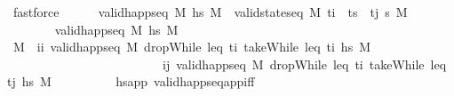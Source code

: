 \begin{isabellebody}
\ fastforce\isanewline
\isanewline
\ \ \ \ \isamarkupfalse%
\ {\isachardoublequoteopen}valid{\isacharunderscore}{\kern0pt}happ{\isacharunderscore}{\kern0pt}seq\ M\ {\isacharquery}{\kern0pt}hs{\isacharprime}{\kern0pt}\ M{\isacharprime}{\kern0pt}\ {\isasymlongleftrightarrow}\ valid{\isacharunderscore}{\kern0pt}state{\isacharunderscore}{\kern0pt}seq\ M\ {\isacharparenleft}{\kern0pt}{\isacharparenleft}{\kern0pt}t\isactrlsub i{\isacharprime}{\kern0pt}\ {\isacharhash}{\kern0pt}\ ts\ {\isacharat}{\kern0pt}\ {\isacharbrackleft}{\kern0pt}t\isactrlsub j{\isacharbrackright}{\kern0pt}{\isacharparenright}{\kern0pt}\ {\isasympi}s\ M{\isacharprime}{\kern0pt}{\isachardoublequoteclose}\isanewline
\ \ \ \ \isamarkupfalse%
\isanewline
\ \ \ \ \ \ \isamarkupfalse%
\ {\isachardoublequoteopen}valid{\isacharunderscore}{\kern0pt}happ{\isacharunderscore}{\kern0pt}seq\ M\ {\isacharquery}{\kern0pt}hs{\isacharprime}{\kern0pt}\ M{\isacharprime}{\kern0pt}{\isachardoublequoteclose}\isanewline
\ \ \ \ \ \ \isamarkupfalse%
\ \isamarkupfalse%
\ M{\isacharprime}{\kern0pt}{\isacharprime}{\kern0pt}\ \ ii{\isacharprime}{\kern0pt}{\isacharcolon}{\kern0pt}\ {\isachardoublequoteopen}valid{\isacharunderscore}{\kern0pt}happ{\isacharunderscore}{\kern0pt}seq\ M\ {\isacharparenleft}{\kern0pt}dropWhile\ {\isacharparenleft}{\kern0pt}leq\ t\isactrlsub i{\isacharparenright}{\kern0pt}\ {\isacharparenleft}{\kern0pt}takeWhile\ {\isacharparenleft}{\kern0pt}leq\ t\isactrlsub i{\isacharprime}{\kern0pt}{\isacharparenright}{\kern0pt}\ hs{\isacharparenright}{\kern0pt}{\isacharparenright}{\kern0pt}\ M{\isacharprime}{\kern0pt}{\isacharprime}{\kern0pt}{\isachardoublequoteclose}\ \isanewline
\ \ \ \ \ \ \ \ \ \ \ \ \ \ \ \ \ \ \ \ \ \ \ \ \ i{\isacharprime}{\kern0pt}j{\isacharcolon}{\kern0pt}\ {\isachardoublequoteopen}valid{\isacharunderscore}{\kern0pt}happ{\isacharunderscore}{\kern0pt}seq\ M{\isacharprime}{\kern0pt}{\isacharprime}{\kern0pt}\ {\isacharparenleft}{\kern0pt}dropWhile\ {\isacharparenleft}{\kern0pt}leq\ t\isactrlsub i{\isacharprime}{\kern0pt}{\isacharparenright}{\kern0pt}\ {\isacharparenleft}{\kern0pt}takeWhile\ {\isacharparenleft}{\kern0pt}leq\ t\isactrlsub j{\isacharparenright}{\kern0pt}\ hs{\isacharparenright}{\kern0pt}{\isacharparenright}{\kern0pt}\ M{\isacharprime}{\kern0pt}{\isachardoublequoteclose}\isanewline
\ \ \ \ \ \ \ \ \isamarkupfalse%
\ hs{\isacharprime}{\kern0pt}{\isacharunderscore}{\kern0pt}app\ valid{\isacharunderscore}{\kern0pt}happ{\isacharunderscore}{\kern0pt}seq{\isacharunderscore}{\kern0pt}app{\isacharunderscore}{\kern0pt}iff\ \isamarkupfalse%

\end{isabellebody}
